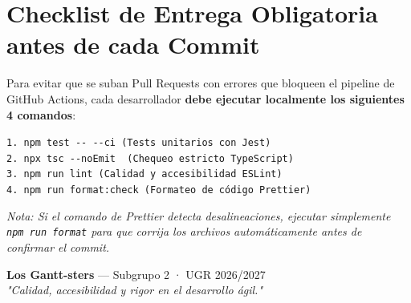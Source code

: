 \documentclass[11pt,a4paper]{article}
\begin{document}
\section{Checklist de Entrega Obligatoria antes de cada Commit}

Para evitar que se suban Pull Requests con errores que bloqueen el pipeline de GitHub Actions, cada desarrollador \textbf{debe ejecutar localmente los siguientes 4 comandos}:

\begin{tcolorbox}[colback=ggray,colframe=gnavy,title=\textbf{Protocolo de Verificación Local (4 Checks Verdes)}]
\texttt{1. npm test -{}- -{}-ci \qquad\qquad\quad\quad (Tests unitarios con Jest)}\\
\texttt{2. npx tsc -{}-noEmit \qquad\qquad\quad\quad\ (Chequeo estricto TypeScript)}\\
\texttt{3. npm run lint \qquad\qquad\quad\quad\quad (Calidad y accesibilidad ESLint)}\\
\texttt{4. npm run format:check \qquad\quad (Formateo de código Prettier)}
\end{tcolorbox}

\noindent\textit{Nota: Si el comando de Prettier detecta desalineaciones, ejecutar simplemente \texttt{npm run format} para que corrija los archivos automáticamente antes de confirmar el commit.}

\vspace{0.8cm}
\begin{center}
\textbf{Los Gantt-sters} --- Subgrupo 2 · UGR 2026/2027\\
\textit{"Calidad, accesibilidad y rigor en el desarrollo ágil."}
\end{center}
\end{document}
